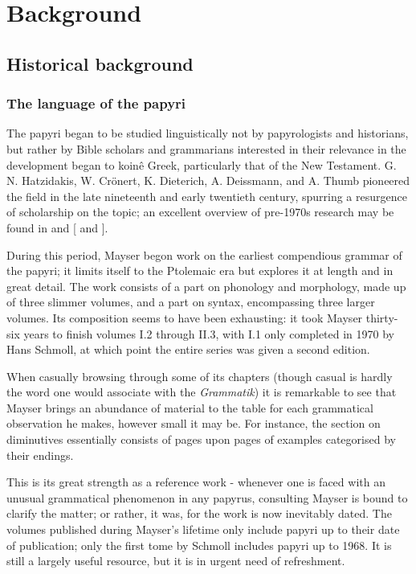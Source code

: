 
\chapter{Background}
\label{chp:background}

\section{Historical background}
\subsection{The language of the papyri}

The papyri began to be studied linguistically not by papyrologists and
historians, but rather by Bible scholars and grammarians interested in their
relevance in the development began to koin\^{e} Greek, particularly that of the
New Testament. G. N.  Hatzidakis, W. Cr\"onert, K. Dieterich, A. Deissmann, and
A.  Thumb pioneered the field in the late nineteenth and early twentieth
century, spurring a resurgence of scholarship on the topic; an excellent
overview of pre-1970s research may be found in \citet{mandilaras1973} and
\citeauthor{gignac1976} [\citeyear{gignac1976} and \citeyear{gignac1981}].

During this period, Mayser begon work on the earliest compendious grammar of
the papyri; it limits itself to the Ptolemaic era but explores it at length and
in great detail.  The work consists of a part on phonology and morphology, made
up of three slimmer volumes, and a part on syntax, encompassing three larger
volumes. Its composition seems to have been exhausting: it took Mayser
thirty-six years to finish volumes I.2 through II.3, with I.1 only completed in
1970 by Hans Schmoll, at which point the entire series was given a second
edition.

When casually browsing through some of its chapters (though casual is hardly
the word one would associate with the \textit{Grammatik}) it is remarkable to see
that Mayser brings an abundance of material to the table for each grammatical
observation he makes, however small it may be. For instance, the section on
diminutives essentially consists of pages upon pages of examples categorised by
their endings.

This is its great strength as a reference work - whenever one is faced with an
unusual grammatical phenomenon in any papyrus, consulting Mayser is bound to
clarify the matter; or rather, it was, for the work is now inevitably dated.
The volumes published during Mayser's lifetime only include papyri up to their
date of publication; only the first tome by Schmoll includes papyri up to 1968.
It is still a largely useful resource, but it is in urgent need of refreshment.

